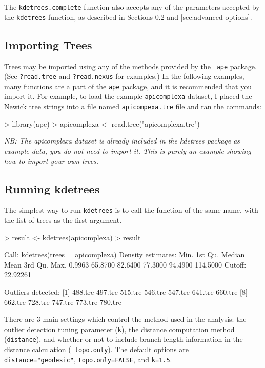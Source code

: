\documentclass{article}
\begin{document}
The {\tt kdetrees.complete} function also accepts any of the
parameters accepted by the {\tt kdetrees} function, as described in
Sections \ref{sec:running-kdetrees} and \ref{sec:advanced-options}.


\subsection{Importing Trees}
\label{sec:importing-trees}

Trees may be imported using any of the methods provided by the {\tt
  ape} package. (See {\tt ?read.tree} and {\tt ?read.nexus} for
examples.) In the following examples, many functions are a part of the
{\tt ape} package, and it is recommended that you import it. For
example, to load the example {\tt apicomplexa} dataset, I placed the
Newick tree strings into a file named {\tt apicompexa.tre} file and
ran the commands:
\begin{Schunk}
\begin{Sinput}
> library(ape)
> apicomplexa <- read.tree("apicomplexa.tre")
\end{Sinput}
\end{Schunk}
\emph{NB: The apicomplexa dataset is already included in the
  kdetrees package as example data, you do not need to import it. This
  is purely an example showing how to import your own trees.}

\subsection{Running kdetrees}
\label{sec:running-kdetrees}

The simplest way to run {\tt kdetrees} is to call the function of the
same name, with the list of trees as the first argument.
\begin{Schunk}
\begin{Sinput}
> result <- kdetrees(apicomplexa)
> result
\end{Sinput}
\begin{Soutput}
Call: kdetrees(trees = apicomplexa)
Density estimates:
    Min.  1st Qu.   Median     Mean  3rd Qu.     Max. 
  0.9963  65.8700  82.6400  77.3000  94.4900 114.5000 
Cutoff:  22.92261 

Outliers detected:
 [1] 488.tre 497.tre 515.tre 546.tre 547.tre 641.tre 660.tre
 [8] 662.tre 728.tre 747.tre 773.tre 780.tre
\end{Soutput}
\end{Schunk}

There are 3 main settings which control the method used in the
analysis: the outlier detection tuning parameter ({\tt k}), the
distance computation method ({\tt distance}), and whether or not to
include branch length information in the distance calculation ({\tt
  topo.only}).  The default options are {\tt distance="geodesic"},
{\tt topo.only=FALSE}, and {\tt k=1.5}.
\end{document}
